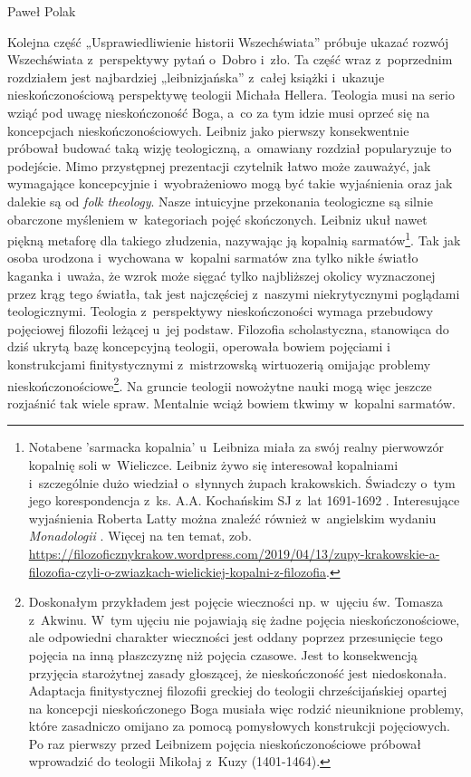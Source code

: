 \begin{recplenv}{Paweł Polak}
\enlargethispage{1\baselineskip}

Kolejna część „Usprawiedliwienie historii Wszechświata” próbuje ukazać rozwój Wszechświata z~perspektywy pytań o~Dobro i~zło.
Ta część wraz z~poprzednim rozdziałem jest najbardziej „leibnizjańska” z~całej książki i~ukazuje
nieskończonościową perspektywę teologii Michała Hellera. Teologia musi na serio wziąć pod uwagę nieskończoność Boga, a~co
za tym idzie musi oprzeć się na koncepcjach nieskończonościowych. Lei\-bniz jako pierwszy konsekwentnie próbował
budować taką wizję teologiczną, a~omawiany rozdział popularyzuje to podejście. Mimo przystępnej prezentacji czytelnik
łatwo może zauważyć, jak wymagające koncepcyjnie i~wyobrażeniowo mogą być takie wyjaśnienia oraz jak dalekie są od
\textit{folk theology}. Nasze intuicyjne przekonania teologiczne są silnie obarczone
myśleniem w~kategoriach pojęć skończonych. Leibniz ukuł nawet piękną metaforę dla takiego złudzenia, nazywając ją
kopalnią sarmatów\footnote{Notabene 'sarmacka kopalnia' u~Leibniza miała za swój realny pierwowzór kopalnię soli w~Wieliczce.
Leibniz żywo się interesował kopalniami i~szczególnie dużo wiedział o~słynnych żupach krakowskich. Świadczy o~tym
jego korespondencja z~ks. A.A. Kochańskim SJ z~lat 1691-1692
\parencite{kochanski_korespondencja_2005,kochanski_korespondencja_2019}.
Interesujące wyjaśnienia Roberta Latty
można znaleźć również w~angielskim wydaniu \textit{Monadologii}
\parencite[s.~346]{leibniz_monadology_1898}.
Więcej na ten temat, zob.
\url{https://filozoficznykrakow.wordpress.com/2019/04/13/zupy-krakowskie-a-filozofia-czyli-o-zwiazkach-wielickiej-kopalni-z-filozofia}.
}.
Tak jak osoba urodzona i~wychowana w~kopalni sarmatów zna tylko nikłe światło kaganka i~uważa, że wzrok może sięgać
tylko najbliższej okolicy wyznaczonej przez krąg tego światła, tak jest najczęściej z~naszymi niekrytycznymi poglądami
teologicznymi. Teologia z~perspektywy nieskończoności wymaga przebudowy pojęciowej filozofii leżącej u~jej podstaw.
Filozofia scholastyczna, stanowiąca do dziś ukrytą bazę koncepcyjną teologii, operowała bowiem pojęciami i
konstrukcjami finitystycznymi z~mistrzowską wirtuozerią omijając problemy nieskończonościowe\footnote{Doskonałym
przykładem jest pojęcie wieczności np. w~ujęciu św. Tomasza z~Akwinu. W~tym ujęciu nie pojawiają się żadne pojęcia
nieskończonościowe, ale odpowiedni charakter wieczności jest oddany poprzez przesunięcie tego pojęcia na inną
płaszczyznę niż pojęcia czasowe. Jest to konsekwencją przyjęcia starożytnej zasady głoszącej, że nieskończoność jest
niedoskonała. Adaptacja finitystycznej filozofii greckiej do teologii chrześcijańskiej opartej na koncepcji
nieskończonego Boga musiała więc rodzić nieuniknione problemy, które zasadniczo omijano za pomocą pomysłowych
konstrukcji pojęciowych. Po raz pierwszy przed Leibnizem pojęcia nieskończonościowe próbował wprowadzić do teologii
Mikołaj z~Kuzy (1401-1464).}. Na gruncie teologii nowożytne nauki mogą więc jeszcze rozjaśnić tak wiele spraw.
Mentalnie wciąż bowiem tkwimy w~kopalni sarmatów.


\end{recplenv}
